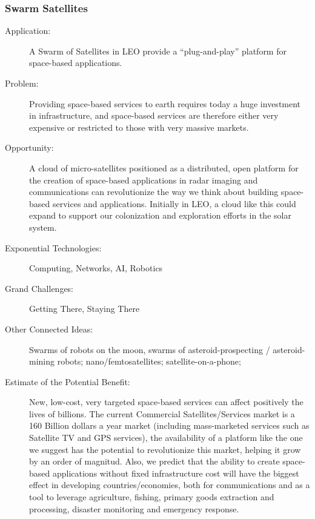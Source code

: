 \subsubsection{Swarm  Satellites}
\label{swarm}
 \begin{description}  \item[Application:] A Swarm of Satellites in \gls{LEO} provide a  ``plug-and-play'' platform for space-based applications.
 
  \item[Problem:] Providing  space-based services to earth requires today a huge investment in  infrastructure, and space-based services are therefore either very  expensive or restricted to those with very massive markets.
 
  \item[Opportunity:] A cloud of  micro-satellites positioned as a distributed, open platform for the  creation of space-based applications in radar imaging and communications can revolutionize the way we think about building space-based services  and applications. Initially in \gls{LEO}, a cloud like this could expand to  support our colonization and exploration efforts in the solar system.
 
  \item[Exponential Technologies:]  Computing, Networks, AI, Robotics
 
  \item[Grand Challenges:] Getting  There, Staying There
 
  \item[Other Connected Ideas:]  Swarms of robots on the moon, swarms of asteroid-prospecting /  asteroid-mining robots; nano/femtosatellites; satellite-on-a-phone;
 
  \item[Estimate of the Potential  Benefit:]New, low-cost, very targeted space-based services can affect  positively the lives of billions. The current Commercial  Satellites/Services market is a 160 Billion dollars a year market  (including mass-marketed services such as Satellite TV and GPS  services), the availability of a platform like the one we suggest has  the potential to revolutionize this market, helping it grow by an order  of magnitud. Also, we predict that the ability to create space-based  applications without fixed infrastructure cost will have the biggest  effect in developing countries/economies, both for communications and as  a tool to leverage agriculture, fishing, primary goods extraction and  processing, disaster monitoring and emergency response.
 

\end{description}
